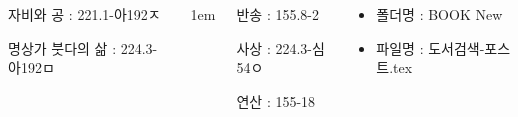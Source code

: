 \documentclass[	20pt, 
							a1paper, 
							portrait, %
							margin=0mm, %
							innermargin=10mm,  		%
							colspace=5mm, 
							subcolspace=0mm
							]{tikzposter}
\begin{document}
\begin{columns}
{\begin{LARGE}
		자비와 공 : 221.1-아192ㅈ

		명상가 붓다의 삶 : 224.3-아192ㅁ

				\end{LARGE}
			} %


			{
					\setlength{\leftmargini}{4em}
					\setlength{\labelsep} {1em}
				\begin{LARGE}
반송  : 155.8-2  %

사상  :  224.3-심54ㅇ %

연산  :  155-18    %



				\end{LARGE}
			}

			{
				\begin{LARGE}
					\begin{itemize}
					\item 폴더명 : BOOK New
					\item 파일명 : 도서검색-포스트.tex
					\end{itemize}
				\end{LARGE}
			}


	\end{columns}
\end{document}
